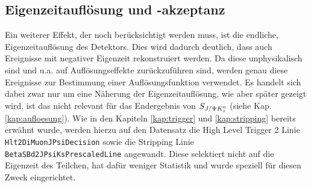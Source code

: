 \subsection{Eigenzeitauflösung und -akzeptanz}
Ein weiterer Effekt, der noch berücksichtigt werden muss, ist die endliche, Ei\-gen\-zeit\-auf\-lösung des Detektors. Dies wird dadurch deutlich, dass auch Ereignisse mit negativer Eigenzeit rekonstruiert werden. Da diese unphysikalisch sind und u.a. auf Auflösungseffekte zurückzuführen sind, werden genau diese Ereignisse zur Bestimmung einer Auflösungsfunktion verwendet. Es handelt sich dabei zwar nur um eine Näherung der Eigenzeitauflösung, wie aber später gezeigt wird, ist das nicht relevant für das Endergebnis von $S_{J/\Psi K_s^0}$ (siehe Kap. \ref{kap:aufloesung}). Wie in den Kapiteln \ref{kap:trigger} und \ref{kap:stripping} bereits erwähnt wurde, werden hierzu auf den Datensatz die High Level Trigger 2 Linie \texttt{Hlt2DiMuonJPsiDecision} sowie die Stripping Linie \texttt{BetaSBd2JPsiKsPrescaledLine} angewandt. Diese selektiert nicht auf die Eigenzeit des Teilchen, hat dafür weniger Statistik und wurde speziell für diesen Zweck eingerichtet.

